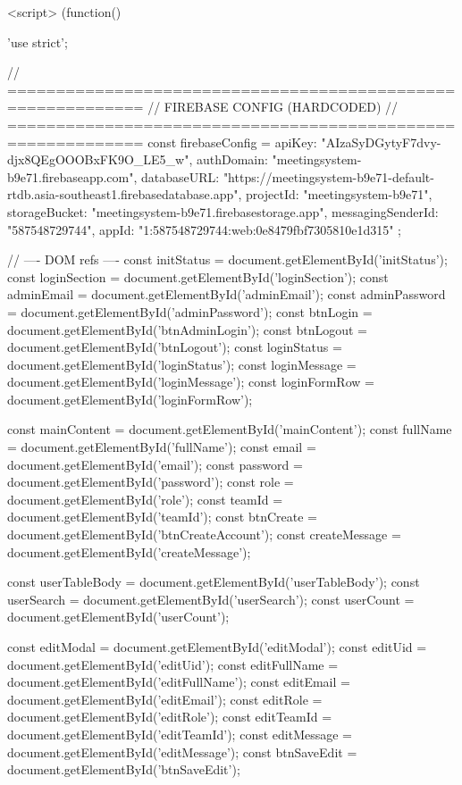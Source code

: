     <script>
        (function() {
            'use strict';

            // ============================================================
            // FIREBASE CONFIG (HARDCODED)
            // ============================================================
            const firebaseConfig = {
                apiKey: "AIzaSyDGytyF7dvy-djx8QEgOOOBxFK9O_LE5_w",
                authDomain: "meetingsystem-b9e71.firebaseapp.com",
                databaseURL: "https://meetingsystem-b9e71-default-rtdb.asia-southeast1.firebasedatabase.app",
                projectId: "meetingsystem-b9e71",
                storageBucket: "meetingsystem-b9e71.firebasestorage.app",
                messagingSenderId: "587548729744",
                appId: "1:587548729744:web:0e8479fbf7305810e1d315"
            };

            // ---- DOM refs ----
            const initStatus = document.getElementById('initStatus');
            const loginSection = document.getElementById('loginSection');
            const adminEmail = document.getElementById('adminEmail');
            const adminPassword = document.getElementById('adminPassword');
            const btnLogin = document.getElementById('btnAdminLogin');
            const btnLogout = document.getElementById('btnLogout');
            const loginStatus = document.getElementById('loginStatus');
            const loginMessage = document.getElementById('loginMessage');
            const loginFormRow = document.getElementById('loginFormRow');

            const mainContent = document.getElementById('mainContent');
            const fullName = document.getElementById('fullName');
            const email = document.getElementById('email');
            const password = document.getElementById('password');
            const role = document.getElementById('role');
            const teamId = document.getElementById('teamId');
            const btnCreate = document.getElementById('btnCreateAccount');
            const createMessage = document.getElementById('createMessage');

            const userTableBody = document.getElementById('userTableBody');
            const userSearch = document.getElementById('userSearch');
            const userCount = document.getElementById('userCount');

            const editModal = document.getElementById('editModal');
            const editUid = document.getElementById('editUid');
            const editFullName = document.getElementById('editFullName');
            const editEmail = document.getElementById('editEmail');
            const editRole = document.getElementById('editRole');
            const editTeamId = document.getElementById('editTeamId');
            const editMessage = document.getElementById('editMessage');
            const btnSaveEdit = document.getElementById('btnSaveEdit');

}
